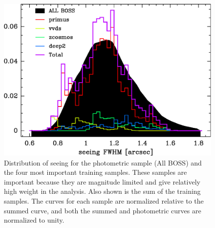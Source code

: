 \documentclass[preprint]{aastex}
\begin{document}
\begin{figure}[h]\centering
    \includegraphics[scale=0.7]{figures/primus-vvds-zcosmos-deep2-match-seeing-10.eps}

    \caption{Distribution of seeing for the photometric sample (All BOSS) and
    the four most important training samples.  These samples are important
    because they are magnitude limited and give relatively high weight in the
    analysis.  Also shown is the sum of the training samples.  The curves for
    each sample are normalized relative to the summed curve,  and both the
    summed and photometric curves are normalized to unity.}

    \label{fig:seeing}
\end{figure}
\end{document}

